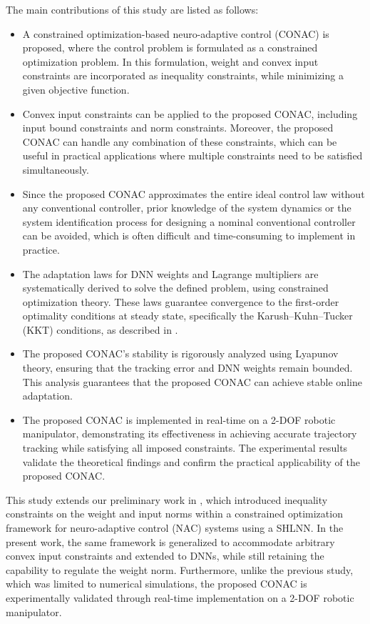 \documentclass[letterpaper, journal]{IEEEtran}
\begin{document}
The main contributions of this study are listed as follows:
\begin{itemize}
    \item A constrained optimization-based neuro-adaptive control (CONAC) is proposed, where the control problem is formulated as a constrained optimization problem. In this formulation, weight and convex input constraints are incorporated as inequality constraints, while minimizing a given objective function.
    \item Convex input constraints can be applied to the proposed CONAC, including input bound constraints and norm constraints. Moreover, the proposed CONAC can handle any combination of these constraints, which can be useful in practical applications where multiple constraints need to be satisfied simultaneously.
    \item Since the proposed CONAC approximates the entire ideal control law without any conventional controller, prior knowledge of the system dynamics or the system identification process for designing a nominal conventional controller can be avoided, which is often difficult and time-consuming to implement in practice. 
    \item The adaptation laws for DNN weights and Lagrange multipliers are systematically derived to solve the defined problem, using constrained optimization theory. These laws guarantee convergence to the first-order optimality conditions at steady state, specifically the Karush–Kuhn–Tucker (KKT) conditions, as described in \cite[Chap. 12, Thm. 12.1]{Nocedal:2006aa}.
    \item The proposed CONAC's stability is rigorously analyzed using Lyapunov theory, ensuring that the tracking error and DNN weights remain bounded. This analysis guarantees that the proposed CONAC can achieve stable online adaptation.
    \item The proposed CONAC is implemented in real-time on a 2-DOF robotic manipulator, demonstrating its effectiveness in achieving accurate trajectory tracking while satisfying all imposed constraints. The experimental results validate the theoretical findings and confirm the practical applicability of the proposed CONAC.
\end{itemize}

\hfill

This study extends our preliminary work in \cite{Ryu:2025aa}, which introduced inequality constraints on the weight and input norms within a constrained optimization framework for neuro-adaptive control (NAC) systems using a SHLNN. 
In the present work, the same framework is generalized to accommodate arbitrary convex input constraints and extended to DNNs, while still retaining the capability to regulate the weight norm. 
Furthermore, unlike the previous study, which was limited to numerical simulations, the proposed CONAC is experimentally validated through real-time implementation on a 2-DOF robotic manipulator.
\end{document}
